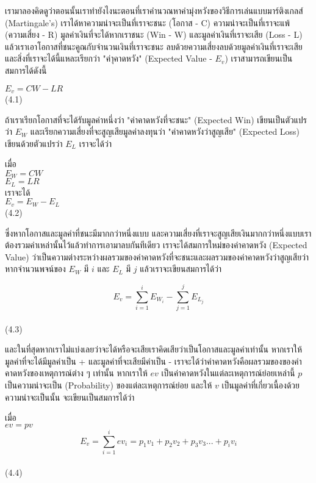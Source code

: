 \documentclass{article}
\begin{document}
เรามาลองคิดดูว่าตอนนั้นเราทำยังไงนะตอนที่เราคำนวณหาค่ามุ่งหวังของวิธีการเล่นแบบมาร์ติงเกลส์ (Martingale's) เราได้หาความน่าจะเป็นที่เราจะชนะ (โอกาส - C) ความน่าจะเป็นที่เราจะแพ้ (ความเสี่ยง - R) มูลค่าเงินที่จะได้หากเราชนะ (Win - W) และมูลค่าเงินที่เราจะเสีย (Loss - L) แล้วเราเอาโอกาสที่ชนะคูณกับจำนวนเงินที่เราจะชนะ ลบด้วยความเสี่ยงลบด้วยมูลค่าเงินที่เราจะเสีย และสิ่งที่เราจะได้นี้แหละเรียกว่า "ค่าุคาดหวัง" (Expected Value - $E_v$) เราสามารถเขียนเป็นสมการได้ดังนี้

\begin{center}
$E_v = CW - LR$\\
(4.1)
\end{center} 

ถ้าเราเรียกโอกาสที่จะได้รับมูลค่าหนึ่งว่า "ค่าคาดหวังที่จะชนะ" (Expected Win)  เขียนเป็นตัวแปรว่า $E_W$ และเรียกความเสี่ยงที่จะสูญเสียมูลค่าลงทุนว่า "ค่าคาดหวังว่าสูญเสีย" (Expected Loss) เขียนด้วยตัวแปรว่า $E_L$ เราจะได้ว่า

 \begin{center}
 เมื่อ\\
$E_W=CW$\\
$E_L=LR$\\
เราจะได้\\
$E_v = E_W - E_L$\\
(4.2)
\end{center} 

ซึ่งหากโอกาสและมูลค่าที่ชนะมีมากกว่าหนึ่งแบบ และความเสี่ยงที่เราจะสูญเสียเงินมากกว่าหนึ่งแบบเราต้องรวมค่าเหล่านั้นไว้แล้วทำการเอามาลบกันทีเดียว เราจะได้สมการใหม่ของค่าคาดหวัง (Expected Value) ว่าเป็นความต่างระหว่างผลรวมของค่าคาดหวังที่จะชนะและผลรวมของค่าคาดหวังว่าสูญเสียว่า หากจำนวนพจน์ของ $E_W$ มี $i$ และ $E_L$ มี $j$ แล้วเราจะเขียนสมการได้ว่า

\begin{center}
$$E_v=\sum_{i=1}^{i}E_{W_i}-\sum_{j=1}^{j}E_{L_j}$$\\(4.3)\\
\end{center}

และในที่สุดหากเราไม่แบ่งเลยว่าจะได้หรือจะเสียเราคิดเสียว่าเป็นโอกาสและมูลค่าเท่านั้น หากเราให้มูลค่าที่จะได้มีมูลค่าเป็น + และมูลค่าที่จะเสียมีค่าเป็น - เราจะได้ว่าค่าคาดหวังคือผลรวมของของค่าคาดหวังของเหตุการณ์ต่าง ๆ เท่านั้น หากเราให้ $ev$ เป็นค่าคาดหวังในแต่ละเหตุการณ์ย่อยเหล่านี้ $p$ เป็นความน่าจะเป็น (Probability) ของแต่ละเหตุการณ์ย่อย และให้ $v$ เป็นมูลค่าที่เกี่ยวเนื้องด้วยความน่าจะเป็นนั้น จะเขียนเป็นสมการได้ว่า

\begin{center}
เมื่อ\\
$ev=pv$\\
$$E_v=\sum_{i=1}^{i}ev_i=p_1v_1+p_2v_2+p_3v_3...+p_iv_i$$\\(4.4)\\
\end{center}
\end{document}

